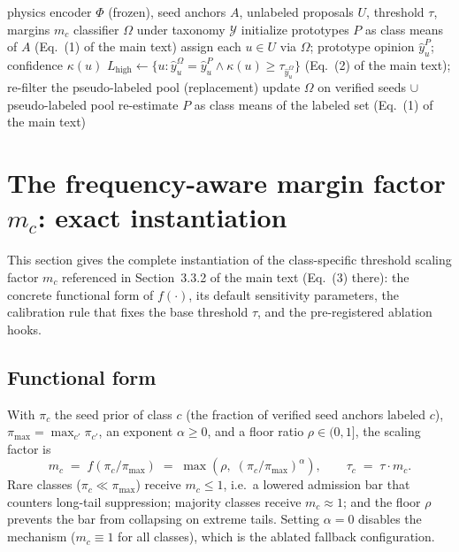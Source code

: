 \documentclass[11pt,a4paper]{article}
\begin{document}
\begin{algorithm}[t]
\caption{Anchor-guided iterative pseudo-labeling (referenced from Section~3.3.2 of the main text)}\label{alg:pseudoloop}
\begin{algorithmic}[1]
\Require physics encoder $\Phi$ (frozen), seed anchors $A$, unlabeled proposals $U$, threshold $\tau$, margins $m_c$
\Ensure classifier $\Omega$ under taxonomy $\mathcal{Y}$
\State initialize prototypes $P$ as class means of $A$ (Eq.~(1) of the main text)
\Repeat
  \State assign each $u \in U$ via $\Omega$; prototype opinion $\hat{y}^{P}_u$; confidence $\kappa(u)$
  \State $L_{\mathrm{high}} \leftarrow \{u : \hat{y}^{\Omega}_u = \hat{y}^{P}_u \wedge \kappa(u) \geq \tau_{\hat{y}^{\Omega}_u}\}$ (Eq.~(2) of the main text); re-filter the pseudo-labeled pool (replacement)
  \State update $\Omega$ on verified seeds $\cup$ pseudo-labeled pool
  \State re-estimate $P$ as class means of the labeled set (Eq.~(1) of the main text)
\end{algorithmic}
\end{algorithm}

\section{The frequency-aware margin factor $m_c$: exact instantiation}\label{app:mc}

This section gives the complete instantiation of the class-specific threshold scaling factor $m_c$ referenced in Section~3.3.2 of the main text (Eq.~(3) there): the concrete functional form of $f(\cdot)$, its default sensitivity parameters, the calibration rule that fixes the base threshold $\tau$, and the pre-registered ablation hooks.

\subsection{Functional form}

With $\pi_c$ the seed prior of class $c$ (the fraction of verified seed anchors labeled $c$), $\pi_{\max} = \max_{c'} \pi_{c'}$, an exponent $\alpha \geq 0$, and a floor ratio $\rho \in (0,1]$, the scaling factor is
\begin{equation}\label{eq:mc-supp}
m_c \;=\; f\!\left(\pi_c / \pi_{\max}\right) \;=\; \max\!\left(\rho,\; \left(\pi_c / \pi_{\max}\right)^{\alpha}\right),
\qquad \tau_c \;=\; \tau \cdot m_c .
\end{equation}
Rare classes ($\pi_c \ll \pi_{\max}$) receive $m_c \leq 1$, i.e.\ a lowered admission bar that counters long-tail suppression; majority classes receive $m_c \approx 1$; and the floor $\rho$ prevents the bar from collapsing on extreme tails. Setting $\alpha = 0$ disables the mechanism ($m_c \equiv 1$ for all classes), which is the ablated fallback configuration.
\end{document}
